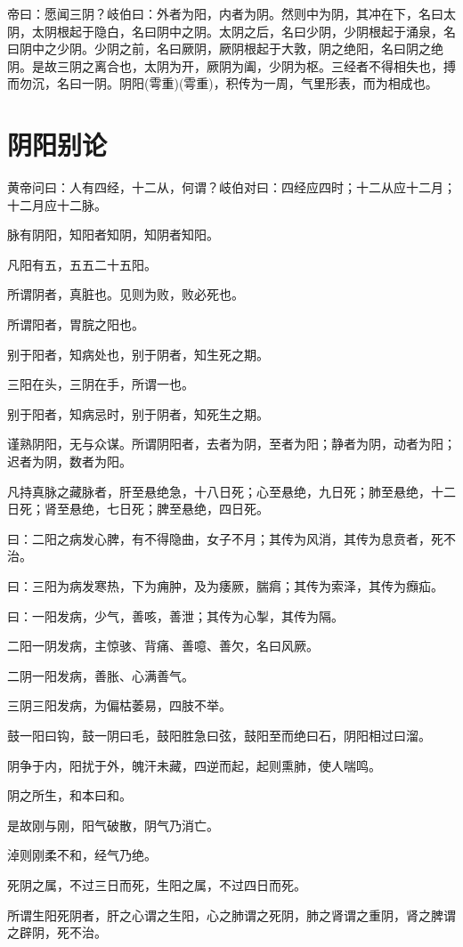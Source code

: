 \documentclass{article}%
\begin{document}
帝曰：愿闻三阴？岐伯曰：外者为阳，内者为阴。然则中为阴，其冲在下，名曰太阴，太阴根起于隐白，名曰阴中之阴。太阴之后，名曰少阴，少阴根起于涌泉，名曰阴中之少阴。少阴之前，名曰厥阴，厥阴根起于大敦，阴之绝阳，名曰阴之绝阴。是故三阴之离合也，太阴为开，厥阴为阖，少阴为枢。三经者不得相失也，搏而勿沉，名曰一阴。阴阳(雩重)(雩重)，积传为一周，气里形表，而为相成也。
\section{阴阳别论}
黄帝问曰：人有四经，十二从，何谓？岐伯对曰：四经应四时；十二从应十二月；十二月应十二脉。

脉有阴阳，知阳者知阴，知阴者知阳。

凡阳有五，五五二十五阳。

所谓阴者，真脏也。见则为败，败必死也。

所谓阳者，胃脘之阳也。

别于阳者，知病处也，别于阴者，知生死之期。

三阳在头，三阴在手，所谓一也。

别于阳者，知病忌时，别于阴者，知死生之期。

谨熟阴阳，无与众谋。所谓阴阳者，去者为阴，至者为阳；静者为阴，动者为阳；迟者为阴，数者为阳。

凡持真脉之藏脉者，肝至悬绝急，十八日死；心至悬绝，九日死；肺至悬绝，十二日死；肾至悬绝，七日死；脾至悬绝，四日死。

曰：二阳之病发心脾，有不得隐曲，女子不月；其传为风消，其传为息贲者，死不治。

曰：三阳为病发寒热，下为痈肿，及为痿厥，腨㾓；其传为索泽，其传为㿗疝。

曰：一阳发病，少气，善咳，善泄；其传为心掣，其传为隔。

二阳一阴发病，主惊骇、背痛、善噫、善欠，名曰风厥。

二阴一阳发病，善胀、心满善气。

三阴三阳发病，为偏枯萎易，四肢不举。

鼓一阳曰钩，鼓一阴曰毛，鼓阳胜急曰弦，鼓阳至而绝曰石，阴阳相过曰溜。

阴争于内，阳扰于外，魄汗未藏，四逆而起，起则熏肺，使人喘鸣。

阴之所生，和本曰和。

是故刚与刚，阳气破散，阴气乃消亡。

淖则刚柔不和，经气乃绝。

死阴之属，不过三日而死，生阳之属，不过四日而死。

所谓生阳死阴者，肝之心谓之生阳，心之肺谓之死阴，肺之肾谓之重阴，肾之脾谓之辟阴，死不治。
\end{document}
